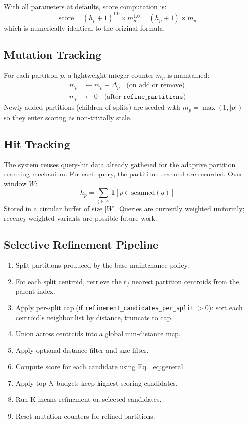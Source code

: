 \documentclass[sigconf, nonacm]{acmart}
\begin{document}
With all parameters at defaults, score computation is:
\begin{equation}
  \mathrm{score} = (h_p + 1)^{1.0} \times m_p^{1.0}
    = (h_p + 1) \times m_p
\end{equation}
which is numerically identical to the original formula.

\subsection{Mutation Tracking}

For each partition $p$, a lightweight integer counter
$m_p$ is maintained:
\begin{align}
  m_p &\leftarrow m_p + \Delta_p \quad \text{(on add or remove)} \\
  m_p &\leftarrow 0 \quad \text{(after } \texttt{refine\_partitions}\text{)}
\end{align}
Newly added partitions (children of splits) are seeded with
$m_p = \max(1, |p|)$ so they enter scoring as non-trivially stale.

\subsection{Hit Tracking}

The system reuses query-hit data already gathered for the adaptive
partition scanning mechanism. For each query, the partitions scanned
are recorded. Over window $W$:
\begin{equation}
  h_p = \sum_{q \in W} \mathbf{1}[p \in \mathrm{scanned}(q)]
\end{equation}
Stored in a circular buffer of size $|W|$. Queries are currently
weighted uniformly; recency-weighted variants are possible future work.

\subsection{Selective Refinement Pipeline}

\begin{enumerate}[leftmargin=*]
  \item Split partitions produced by the base maintenance policy.
  \item For each split centroid, retrieve the $r_f$ nearest partition
    centroids from the parent index.
  \item Apply per-split cap (if \texttt{refinement\_candidates\_per\_split} $> 0$):
    sort each centroid's neighbor list by distance, truncate to cap.
  \item Union across centroids into a global min-distance map.
  \item Apply optional distance filter and size filter.
  \item Compute score for each candidate using Eq.~\ref{eq:general}.
  \item Apply top-$K$ budget: keep highest-scoring candidates.
  \item Run K-means refinement on selected candidates.
  \item Reset mutation counters for refined partitions.
\end{enumerate}
\end{document}
